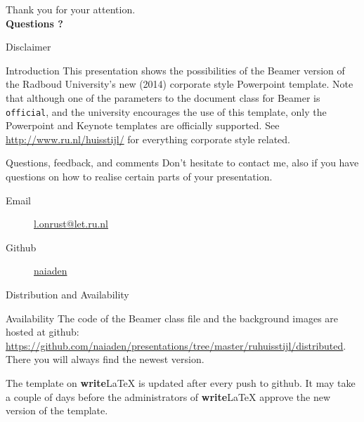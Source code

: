 \documentclass[showdate=true, slidenumbers=slide]{beamerruhuisstijl169}
\begin{document}
\begin{frame}
\vfill
\centering
{\LARGE Thank you for your attention.}\\
\vspace{1cm}
{\Large \textbf{Questions ?}}
\vfill
\end{frame}

\appendix
\begin{frame}{Disclaimer}
    \begin{block}{Introduction}
        This presentation shows the possibilities of the Beamer version of the Radboud University's new (2014) corporate style Powerpoint template. Note that although one of the parameters to the document class for Beamer is \texttt{official}, and the university encourages the use of this template, only the Powerpoint and Keynote templates are officially supported. See \url{http://www.ru.nl/huisstijl/} for everything corporate style related.
    \end{block}

    \begin{block}{Questions, feedback, and comments}
        Don't hesitate to contact me, also if you have questions on how to realise certain parts of your presentation.
        \begin{description}
            \item[Email] \href{mailto:l.onrust@let.ru.nl}{l.onrust@let.ru.nl}
            \item[Github] \href{https://github.com/naiaden}{naiaden}
        \end{description}
    \end{block}
\end{frame}

\begin{frame}{Distribution and Availability}
    \begin{block}{Availability}
        The code of the Beamer class file and the background images are hosted at github: \url{https://github.com/naiaden/presentations/tree/master/ruhuisstijl/distributed}. There you will always find the newest version.

        The template on \textbf{write}\LaTeX{} is updated after every push to github. It may take a couple of days before the administrators of \textbf{write}\LaTeX{} approve the new version of the template.
    \end{block}

\end{frame}
\end{document}
